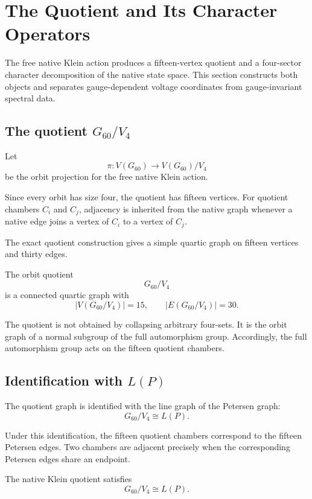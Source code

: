 \section{The Quotient and Its Character Operators}

The free native Klein action produces a fifteen-vertex quotient and a
four-sector character decomposition of the native state space. This
section constructs both objects and separates gauge-dependent voltage
coordinates from gauge-invariant spectral data.

\subsection{The quotient \(G_{60}/V_4\)}

Let
\[
\pi:V(G_{60})\longrightarrow V(G_{60})/V_4
\]
be the orbit projection for the free native Klein action.

Since every orbit has size four, the quotient has fifteen vertices.
For quotient chambers \(C_i\) and \(C_j\), adjacency is inherited from
the native graph whenever a native edge joins a vertex of \(C_i\) to a
vertex of \(C_j\).

The exact quotient construction gives a simple quartic graph on
fifteen vertices and thirty edges.

\begin{proposition}
The orbit quotient
\[
G_{60}/V_4
\]
is a connected quartic graph with
\[
|V(G_{60}/V_4)|=15,
\qquad
|E(G_{60}/V_4)|=30.
\]
\end{proposition}

The quotient is not obtained by collapsing arbitrary four-sets. It is
the orbit graph of a normal subgroup of the full automorphism group.
Accordingly, the full automorphism group acts on the fifteen quotient
chambers.

\subsection{Identification with \(L(P)\)}

The quotient graph is identified with the line graph of the Petersen
graph:
\[
G_{60}/V_4\cong L(P).
\]

Under this identification, the fifteen quotient chambers correspond
to the fifteen Petersen edges. Two chambers are adjacent precisely
when the corresponding Petersen edges share an endpoint.

\begin{theorem}
The native Klein quotient satisfies
\[
G_{60}/V_4\cong L(P).
\]
\end{theorem}

